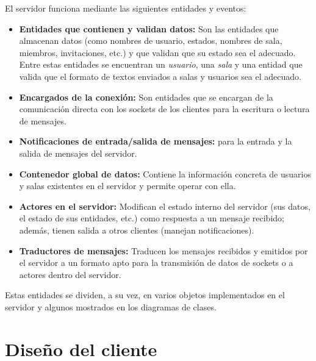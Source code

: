 El servidor funciona mediante las siguientes entidades y eventos:
\begin{itemize}
	\item \textbf{Entidades que contienen y validan datos:} Son las entidades que almacenan datos (como nombres de usuario, estados, nombres de sala, miembros, invitaciones, etc.) y que validan que su estado sea el adecuado. Entre estas entidades se encuentran un \textit{usuario}, una \textit{sala} y una entidad que valida que el formato de textos enviados a salas y usuarios sea el adecuado.
	\item \textbf{Encargados de la conexión:} Son entidades que se encargan de la comunicación directa con los sockets de los clientes para la escritura o lectura de mensajes.
	\item \textbf{Notificaciones de entrada/salida de mensajes:} para la entrada y la salida de mensajes del servidor.
	\item \textbf{Contenedor global de datos:} Contiene la información concreta de usuarios y salas existentes en el servidor y permite operar con ella.
	\item \textbf{Actores en el servidor:} Modifican el estado interno del servidor (sus datos, el estado de sus entidades, etc.) como respuesta a un mensaje recibido; además, tienen salida a otros clientes (manejan notificaciones).
	\item \textbf{Traductores de mensajes:} Traducen los mensajes recibidos y emitidos por el servidor a un formato apto para la transmisión de datos de sockets o a actores dentro del servidor.
\end{itemize}
Estas entidades se dividen, a su vez, en varios objetos implementados en el servidor y algunos mostrados en los diagramas de clases.

\section{Diseño del cliente}

